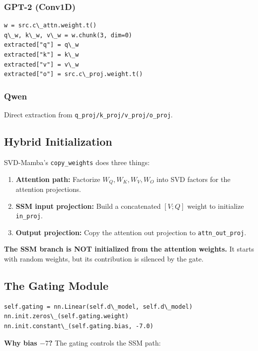 \subsubsection{GPT-2 (Conv1D)}

\begin{lstlisting}
w = src.c\_attn.weight.t()
q\_w, k\_w, v\_w = w.chunk(3, dim=0)
extracted["q"] = q\_w
extracted["k"] = k\_w
extracted["v"] = v\_w
extracted["o"] = src.c\_proj.weight.t()
\end{lstlisting}

\subsubsection{Qwen}

Direct extraction from \texttt{q\_proj/k\_proj/v\_proj/o\_proj}.

\subsection{Hybrid Initialization}

SVD-Mamba's \texttt{copy\_weights} does three things:

\begin{enumerate}
\item \textbf{Attention path:} Factorize $W_Q, W_K, W_V, W_O$ into SVD factors
  for the attention projections.
\item \textbf{SSM input projection:} Build a concatenated $[V; Q]$ weight to
  initialize \texttt{in\_proj}.
\item \textbf{Output projection:} Copy the attention out projection to \texttt{attn\_out\_proj}.

\end{enumerate}
\textbf{The SSM branch is NOT initialized from the attention weights.} It starts 
with random weights, but its contribution is silenced by the gate.

\subsection{The Gating Module}

\begin{lstlisting}
self.gating = nn.Linear(self.d\_model, self.d\_model)
nn.init.zeros\_(self.gating.weight)
nn.init.constant\_(self.gating.bias, -7.0)
\end{lstlisting}

\textbf{Why bias $-7$?} The gating controls the SSM path:

